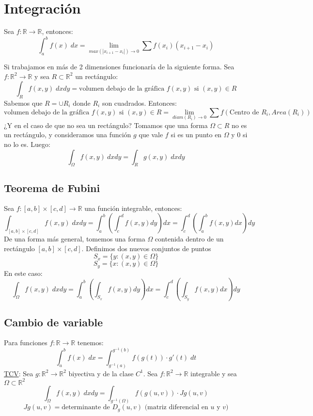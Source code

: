 \documentclass[11pt]{article}
\providecommand{\abs}[1]{\left\lvert #1\right\rvert}
\providecommand{\abs}[1]{\left\lvert #1\right\rvert}
\newcommand{\R}{\mathbb{R}}
\theoremstyle{plain}
\begin{document}
    \section{Integración} %
    \label{sec:integración}
    Sea $f:\R \rightarrow \R$, entonces:
    \[\int_a^b f(x) \; dx = \lim_{max(\abs{x_{i+1}-x_i}) \to 0} \sum f(x_i)(x_{i+1} -x_i)\]

    Si trabajamos en más de 2 dimensiones funcionaría de la siguiente forma. Sea $f:\R^2 \rightarrow \R$ y sea $R \subset \R^2$ un rectángulo:
    \[\int_R f(x,y)\; dxdy = \text{volumen debajo de la gráfica $f(x,y)$ si $(x,y)\in R$}\]
    Sabemos que $R = \cup R_i$ donde $R_i$ son cuadrados. Entonces:
    \[\text{volumen debajo de la gráfica $f(x,y)$ si $(x,y)\in R$} = \lim_{diam(R_i)\to 0} \sum f(\text{Centro de }R_i,Area(R_i))\]
    ¿Y en el caso de que no sea un rectángulo? Tomamos que una forma $\Omega \subset R$ no es un rectángulo, y consideramos una función $g$ que vale $f$ si es un punto en $\Omega$ y 0 si no lo es. Luego:
    \[\int_\Omega f(x,y) \: dxdy = \int_R g(x,y) \; dxdy \]
    \subsection{Teorema de Fubini} %
    \label{sub:teorema_de_fubini}
        Sea $f:[a,b]\times[c,d] \rightarrow \R$ una función integrable, entonces:
        \[\int_{[a,b]\times[c,d]} f(x,y)\; dx dy = \int_a^b \left(\int_c^d f(x,y) dy\right)dx = \int_c^d \left(\int_a^b f(x,y) dx\right)dy\]
        De una forma más general, tomemos una forma $\Omega$ contenida dentro de un rectángulo $[a,b]\times[c,d]$. Definimos dos nuevos conjuntos de puntos
        \[S_x = \{y:(x,y) \in \Omega\}\]
        \[S_y = \{x:(x,y) \in \Omega\}\] 
        En este caso:
        \[\int_\Omega f(x,y) \; dxdy = \int_a^b \left(\int_{S_x} f(x,y) dy\right)dx = \int_c^d \left(\int_{S_y} f(x,y) dx\right)dy\]
    \subsection{Cambio de variable} %
    \label{sub:cambio_de_variable}
        Para funciones $f:\R\rightarrow \R$ tenemos:
        \[\int_a^b f(x) \; dx = \int_{g^{-1}(a)}^{g^{-1}(b)} f(g(t))\cdot g'(t) \; dt\]
        \underline{TCV}: Sea $g:\R^2 \rightarrow \R^2$ biyectiva y de la clase $C^1$. Sea $f:\R^2 \rightarrow \R$ integrable y sea $\Omega \subset \R^2$
        \[\int_\Omega f(x,y) \; dxdy = \int_{g^{-1}(\Omega)} f(g(u,v))\cdot Jg(u,v)\]
        \[Jg(u,v) = \text{determinante de }D_g(u,v)\text{ (matriz diferencial en $u$ y $v$)}\]
\end{document}

